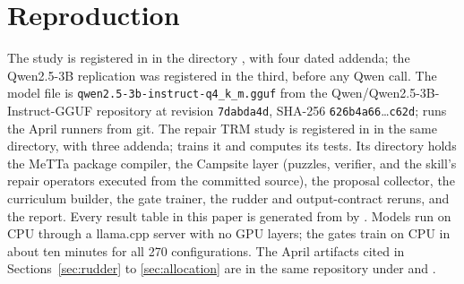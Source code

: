 \documentclass[11pt]{article}
\begin{document}
\section{Reproduction}
\label{app:repro}

The study is registered in  in the directory , with four dated addenda; the Qwen2.5-3B replication was registered in the third, before any Qwen call. The model file is \texttt{qwen2.5-3b-instruct-q4\_k\_m.gguf} from the Qwen/Qwen2.5-3B-Instruct-GGUF repository at revision \texttt{7dabda4d}, SHA-256 \texttt{626b4a66}\ldots\texttt{c62d};  runs the April runners from git. The repair TRM study is registered in  in the same directory, with three addenda;  trains it and  computes its tests. Its  directory holds the MeTTa package compiler, the Campsite layer (puzzles, verifier, and the skill's repair operators executed from the committed source), the proposal collector, the curriculum builder, the gate trainer, the rudder and output-contract reruns, and the report. Every result table in this paper is generated from  by . Models run on CPU through a llama.cpp server with no GPU layers; the gates train on CPU in about ten minutes for all 270 configurations. The April artifacts cited in Sections~\ref{sec:rudder} to \ref{sec:allocation} are in the same repository \citep{hermesskills2026artifacts} under  and .
\end{document}
